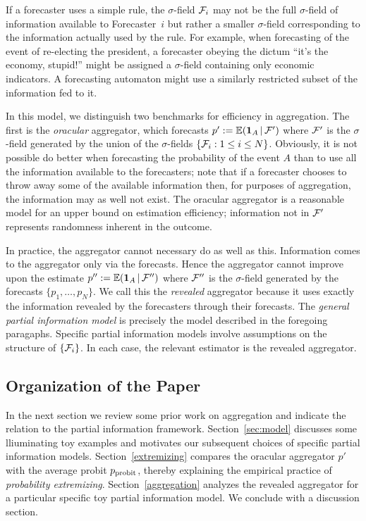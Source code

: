 \documentclass[11pt]{article}
\newcommand{\E}{\mathbb{E}}
\theoremstyle{definition}
\theoremstyle{definition}
\def\one{{\bf 1}}
\def\F{{\cal F}}
\def\E{{\mathbb E}}
\def\|{\, | \,}
\def\probit{p_{\rm probit}}
\begin{document}
If a forecaster uses a simple rule, the $\sigma$-field $\F_i$ may 
not be the full $\sigma$-field of information available to 
Forecaster~$i$ but rather a smaller $\sigma$-field corresponding
to the information actually used by the rule.  For example, 
when forecasting of the event of re-electing the president,
a forecaster obeying the dictum ``it's the economy, stupid!''
might be assigned a $\sigma$-field containing only economic indicators.
A forecasting automaton might use a similarly restricted subset
of the information fed to it.

In this model, we distinguish two benchmarks for efficiency in
aggregation.  The first is the {\em oracular} aggregator, which
forecasts $p' := \E (\one_A \| \F')$ where $\F'$ is the $\sigma$-field
generated by the union of the $\sigma$-fields $\{ \F_i : 1 \leq i 
\leq N \}$.  Obviously, it is not possible do better when forecasting the
probability of the event $A$ than to use all the information available 
to the forecasters; note that if a forecaster chooses to throw away 
some of the available information then, for purposes of aggregation,
the information may as well not exist.  The oracular aggregator
is a reasonable model for an upper bound on estimation efficiency;
information not in $\F'$ represents randomness inherent in the outcome.

In practice, the aggregator cannot necessary do as well as this.  
Information comes to the aggregator only via the forecasts.  Hence the 
aggregator cannot improve upon the estimate $p'' := \E (\one_A \| \F'')$
where $\F''$ is the $\sigma$-field generated by the forecasts
$\{ p_1 , \ldots , p_N \}$.  We call this the {\em revealed} aggregator 
because it uses exactly the information revealed by the forecasters
through their forecasts.  The {\em general partial information model} 
is precisely the model described in the foregoing paragaphs.  
Specific partial information models involve assumptions on
the structure of $\{ \F_i \}$.  In each case, the relevant estimator 
is the revealed aggregator. 

\subsection{Organization of the Paper}

In the next section we review some prior work on aggregation and 
indicate the relation to the partial information framework.
Section~\ref{sec:model} discusses some lliuminating toy examples 
and motivates our subsequent choices of specific partial information 
models.  Section~\ref{extremizing} compares the oracular
aggregator $p'$ with the average probit $\probit$, thereby
explaining the empirical practice of {\em probability extremizing}.
Section~\ref{aggregation} analyzes the revealed aggregator for a
particular specific toy partial information model.  We conclude
with a discussion section.
\end{document}
